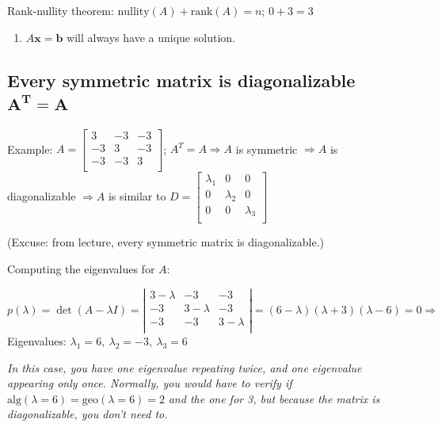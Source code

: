 \documentclass[12pt]{article}
\theoremstyle{plain}
\theoremstyle{remark}
\theoremstyle{definition}
\begin{document}
Rank-nullity theorem: \(\text{nullity}(A) + \text{rank}(A) = n\);
\(0 + 3 = 3\)

\begin{enumerate}
\def\labelenumi{\arabic{enumi}.}
\setcounter{enumi}{4}
\item
  \(A\mathbf{x} = \mathbf{b}\) will always have a unique
  solution.
\end{enumerate}


\subsection{\texorpdfstring{Every symmetric matrix is diagonalizable
\(\mathbf{A}^{\mathbf{T}}\mathbf{= A}\)}{Every symmetric matrix is diagonalizable \textbackslash mathbf\{A\}\^{}\{\textbackslash mathbf\{T\}\}\textbackslash mathbf\{= A\}}}

Example: \(A = \begin{bmatrix}
3 & - 3 & - 3 \\
 - 3 & 3 & - 3 \\
 - 3 & - 3 & 3 \\
\end{bmatrix}\); \(A^{T} = A \Rightarrow A\) is symmetric
\(\Rightarrow A\) is diagonalizable \(\Rightarrow A\) is similar to
\(D = \begin{bmatrix}
\lambda_{1} & 0 & 0 \\
0 & \lambda_{2} & 0 \\
0 & 0 & \lambda_{3} \\
\end{bmatrix}\)

(Excuse: from lecture, every symmetric matrix is diagonalizable.)

Computing the eigenvalues for \(A\):

\(p(\lambda) = \det(A - \lambda I) = \left| \begin{matrix}
3 - \lambda & - 3 & - 3 \\
 - 3 & 3 - \lambda & - 3 \\
 - 3 & - 3 & 3 - \lambda \\
\end{matrix} \right| = (6 - \lambda)(\lambda + 3)(\lambda - 6) = 0 \Rightarrow\)
Eigenvalues: \(\lambda_{1} = 6,\ \lambda_{2} = - 3,\ \lambda_{3} = 6\)

\emph{In this case, you have one eigenvalue repeating twice, and one
eigenvalue appearing only once. Normally, you would have to verify if}
\(\text{alg}(\lambda = 6) = \text{geo}(\lambda = 6) = 2\) \emph{and the
one for 3, but because the matrix is diagonalizable, you don't need to.}
\end{document}
